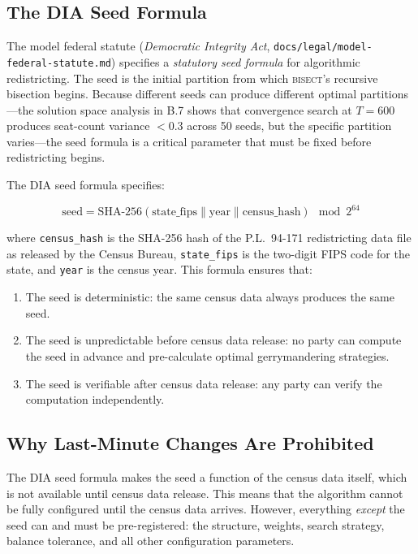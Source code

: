 \label{sec:dia-seed}

\subsection{The DIA Seed Formula}

The model federal statute (\textit{Democratic Integrity Act}, \texttt{docs/legal/model-federal-statute.md})
specifies a \textit{statutory seed formula} for algorithmic redistricting. The seed
is the initial partition from which \textsc{bisect}'s recursive bisection begins.
Because different seeds can produce different optimal partitions---the solution space
analysis in B.7 shows that convergence search at $T=600$ produces seat-count variance
$< 0.3$ across 50 seeds, but the specific partition varies---the seed formula is
a critical parameter that must be fixed before redistricting begins.

The DIA seed formula specifies:

\begin{equation}
\text{seed} = \text{SHA-256}(\text{state\_fips} \| \text{year} \| \text{census\_hash}) \mod 2^{64}
\end{equation}

where \texttt{census\_hash} is the SHA-256 hash of the P.L.\ 94-171 redistricting
data file as released by the Census Bureau, \texttt{state\_fips} is the two-digit
FIPS code for the state, and \texttt{year} is the census year. This formula ensures that:

\begin{enumerate}
\item The seed is deterministic: the same census data always produces the same seed.
\item The seed is unpredictable before census data release: no party can compute
  the seed in advance and pre-calculate optimal gerrymandering strategies.
\item The seed is verifiable after census data release: any party can verify the
  computation independently.
\end{enumerate}

\subsection{Why Last-Minute Changes Are Prohibited}

The DIA seed formula makes the seed a function of the census data itself, which is not
available until census data release. This means that the algorithm cannot be fully
configured until the census data arrives. However, everything \textit{except} the seed
can and must be pre-registered: the structure, weights, search strategy, balance tolerance,
and all other configuration parameters.

